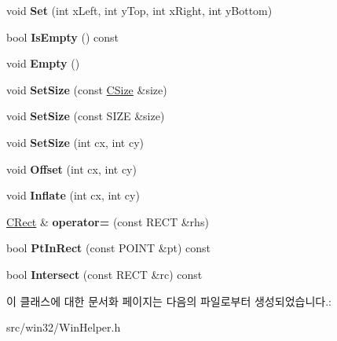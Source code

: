 \begin{DoxyCompactItemize}
void {\bfseries Set} (int x\+Left, int y\+Top, int x\+Right, int y\+Bottom)
\item 
\mbox{\label{class_win_helper_1_1_c_rect_a6a78810f08fbb4559fee4910b531735a}} 
bool {\bfseries Is\+Empty} () const
\item 
\mbox{\label{class_win_helper_1_1_c_rect_a15109200bd331bfcfa7bc7bfd86c2c52}} 
void {\bfseries Empty} ()
\item 
\mbox{\label{class_win_helper_1_1_c_rect_ab53ec9397692f842d8a5c289d44e4741}} 
void {\bfseries Set\+Size} (const \mbox{\hyperlink{class_win_helper_1_1_c_size}{C\+Size}} \&size)
\item 
\mbox{\label{class_win_helper_1_1_c_rect_a00602a2018250d3fb661831c0aa65ca1}} 
void {\bfseries Set\+Size} (const S\+I\+ZE \&size)
\item 
\mbox{\label{class_win_helper_1_1_c_rect_a44277ee1ed92bf43b56021d630992987}} 
void {\bfseries Set\+Size} (int cx, int cy)
\item 
\mbox{\label{class_win_helper_1_1_c_rect_ab241031d5051b5fa34594cd83fa93534}} 
void {\bfseries Offset} (int cx, int cy)
\item 
\mbox{\label{class_win_helper_1_1_c_rect_a360524ba4e46d6ff65f8e6fa2ee7ef6a}} 
void {\bfseries Inflate} (int cx, int cy)
\item 
\mbox{\label{class_win_helper_1_1_c_rect_a138cae1d90a65763cb419e158b4c5dda}} 
\mbox{\hyperlink{class_win_helper_1_1_c_rect}{C\+Rect}} \& {\bfseries operator=} (const R\+E\+CT \&rhs)
\item 
\mbox{\label{class_win_helper_1_1_c_rect_a8417d900e15e2aca83b29225d2dee165}} 
bool {\bfseries Pt\+In\+Rect} (const P\+O\+I\+NT \&pt) const
\item 
\mbox{\label{class_win_helper_1_1_c_rect_ae4e2111ea0d699b212744c15fc8ca560}} 
bool {\bfseries Intersect} (const R\+E\+CT \&rc) const
\end{DoxyCompactItemize}


이 클래스에 대한 문서화 페이지는 다음의 파일로부터 생성되었습니다.\+:\begin{DoxyCompactItemize}
\item 
src/win32/Win\+Helper.\+h\end{DoxyCompactItemize}
